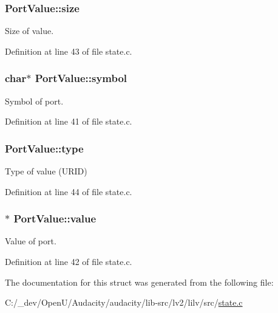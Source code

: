 \subsubsection[{\texorpdfstring{size}{size}}]{ Port\+Value\+::size}\hypertarget{struct_port_value_a93a9aa1527ec35923e040a3c63f2231f}{}\label{struct_port_value_a93a9aa1527ec35923e040a3c63f2231f}


Size of value. 



Definition at line 43 of file state.\+c.

\subsubsection[{\texorpdfstring{symbol}{symbol}}]{\setlength{\rightskip}{0pt plus 5cm}char$\ast$ Port\+Value\+::symbol}\hypertarget{struct_port_value_a3ac36f51d2c4632361b39449834ff6e4}{}\label{struct_port_value_a3ac36f51d2c4632361b39449834ff6e4}


Symbol of port. 



Definition at line 41 of file state.\+c.

\subsubsection[{\texorpdfstring{type}{type}}]{ Port\+Value\+::type}\hypertarget{struct_port_value_a34915942cf7128ad04d42ae42b1cc81e}{}\label{struct_port_value_a34915942cf7128ad04d42ae42b1cc81e}


Type of value (U\+R\+ID) 



Definition at line 44 of file state.\+c.

\subsubsection[{\texorpdfstring{value}{value}}]{$\ast$ Port\+Value\+::value}\hypertarget{struct_port_value_a40b3052f3bf8c4e44b9d005543b765a4}{}\label{struct_port_value_a40b3052f3bf8c4e44b9d005543b765a4}


Value of port. 



Definition at line 42 of file state.\+c.



The documentation for this struct was generated from the following file\+:\begin{DoxyCompactItemize}
\item 
C\+:/\+\_\+dev/\+Open\+U/\+Audacity/audacity/lib-\/src/lv2/lilv/src/\hyperlink{state_8c}{state.\+c}\end{DoxyCompactItemize}
